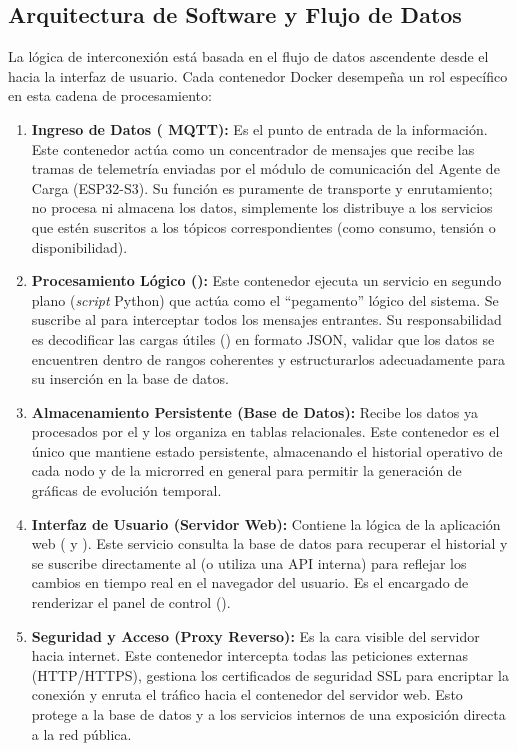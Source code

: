 \subsection{Arquitectura de Software y Flujo de Datos}

La lógica de interconexión está basada en el flujo de datos ascendente desde el  hacia la interfaz de usuario. Cada contenedor Docker desempeña un rol específico en esta cadena de procesamiento:

\begin{enumerate}
    \item \textbf{Ingreso de Datos ( MQTT):} Es el punto de entrada de la información. Este contenedor actúa como un concentrador de mensajes que recibe las tramas de telemetría enviadas por el módulo de comunicación del Agente de Carga (ESP32-S3). Su función es puramente de transporte y enrutamiento; no procesa ni almacena los datos, simplemente los distribuye a los servicios que estén suscritos a los tópicos correspondientes (como consumo, tensión o disponibilidad).

    \item \textbf{Procesamiento Lógico ():} Este contenedor ejecuta un servicio en segundo plano (\textit{script} Python) que actúa como el \enquote{pegamento} lógico del sistema. Se suscribe al  para interceptar todos los mensajes entrantes. Su responsabilidad es decodificar las cargas útiles () en formato JSON, validar que los datos se encuentren dentro de rangos coherentes y estructurarlos adecuadamente para su inserción en la base de datos.

    \item \textbf{Almacenamiento Persistente (Base de Datos):} Recibe los datos ya procesados por el  y los organiza en tablas relacionales. Este contenedor es el único que mantiene estado persistente, almacenando el historial operativo de cada nodo y de la microrred en general para permitir la generación de gráficas de evolución temporal.

    \item \textbf{Interfaz de Usuario (Servidor Web):} Contiene la lógica de la aplicación web ( y ). Este servicio consulta la base de datos para recuperar el historial y se suscribe directamente al  (o utiliza una API interna) para reflejar los cambios en tiempo real en el navegador del usuario. Es el encargado de renderizar el panel de control ().

    \item \textbf{Seguridad y Acceso (Proxy Reverso):} Es la cara visible del servidor hacia internet. Este contenedor intercepta todas las peticiones externas (HTTP/HTTPS), gestiona los certificados de seguridad SSL para encriptar la conexión y enruta el tráfico hacia el contenedor del servidor web. Esto protege a la base de datos y a los servicios internos de una exposición directa a la red pública.
\end{enumerate}

